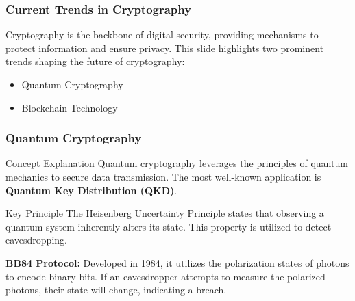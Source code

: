\documentclass{beamer}
\begin{document}
\begin{frame}[fragile]
    \frametitle{Current Trends in Cryptography}
    Cryptography is the backbone of digital security, providing mechanisms to protect information and ensure privacy. 
    This slide highlights two prominent trends shaping the future of cryptography:
    \begin{itemize}
        \item Quantum Cryptography
        \item Blockchain Technology
    \end{itemize}
\end{frame}

\begin{frame}[fragile]
    \frametitle{Quantum Cryptography}
    \begin{block}{Concept Explanation}
        Quantum cryptography leverages the principles of quantum mechanics to secure data transmission. 
        The most well-known application is \textbf{Quantum Key Distribution (QKD)}.
    \end{block}
    
    \begin{block}{Key Principle}
        The Heisenberg Uncertainty Principle states that observing a quantum system inherently alters its state. 
        This property is utilized to detect eavesdropping.
    \end{block}

    \begin{example}
        \textbf{BB84 Protocol:} Developed in 1984, it utilizes the polarization states of photons to encode binary bits. 
        If an eavesdropper attempts to measure the polarized photons, their state will change, indicating a breach.
    \end{example}
\end{frame}
\end{document}
